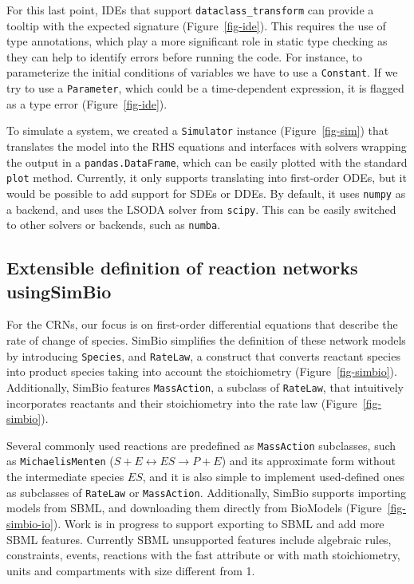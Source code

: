 \documentclass{article}
\begin{document}
For this last point,
\acp{IDE} that support \texttt{dataclass\_transform} \cite{debontePEP681Data2021}
can provide a tooltip with the expected signature (Figure~\ref{fig-ide}).
This requires the use of type annotations,
which play a more significant role in static type checking
as they can help to identify errors before running the code.
For instance, to parameterize the initial conditions of variables
we have to use a \texttt{Constant}.
If we try to use a \texttt{Parameter},
which could be a time-dependent expression,
it is flagged as a type error (Figure~\ref{fig-ide}).

To simulate a system,
we created a \texttt{Simulator} instance (Figure~\ref{fig-sim})
that translates the model into the \ac{RHS} equations
and interfaces with solvers
wrapping the output in a \texttt{pandas.DataFrame},
which can be easily plotted with the standard \texttt{plot} method.
Currently,
it only supports translating into first-order \acp{ODE},
but it would be possible to add support for \acp{SDE} or \acp{DDE}.
By default,
it uses \texttt{numpy} as a backend,
and uses the LSODA solver from \texttt{scipy}.
This can be easily switched to other solvers or backends, such as \texttt{numba}.

\hypertarget{extensible-definition-of-reaction-networks-using-simbio}{
  \subsection{Extensible definition of reaction networks usingSimBio}
  \label{extensible-definition-of-reaction-networks-using-simbio}
}

For the \acp{CRN},
our focus is on first-order differential equations that describe the rate of change of species.
SimBio simplifies the definition of these network models by introducing \texttt{Species},
and \texttt{RateLaw}, a construct that converts reactant species into product species taking into account the stoichiometry (Figure~\ref{fig-simbio}).
Additionally, SimBio features \texttt{MassAction},
a subclass of \texttt{RateLaw},
that intuitively incorporates reactants and their stoichiometry into the rate law (Figure~\ref{fig-simbio}).

Several commonly used reactions are predefined as \texttt{MassAction} subclasses,
such as \texttt{MichaelisMenten} (\(S + E \leftrightarrow ES \rightarrow P + E\))
and its approximate form without the intermediate species \(ES\),
and it is also simple to implement used-defined ones
as subclasses of \texttt{RateLaw} or \texttt{MassAction}.
Additionally, SimBio supports importing models from \ac{SBML},
and downloading them directly from BioModels \cite{malik-sheriffBioModels15Years2020} (Figure~\ref{fig-simbio-io}).
Work is in progress to support exporting to \ac{SBML} and add more \ac{SBML} features.
Currently \ac{SBML} unsupported features include
algebraic rules, constraints, events, reactions with the fast attribute or with math stoichiometry,
units and compartments with size different from 1.
\end{document}
